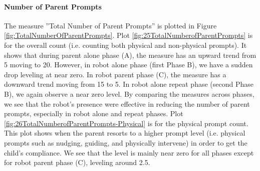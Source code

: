 \paragraph{Number of Parent Prompts}
The measure ''Total Number of Parent Prompts'' is plotted in Figure \ref{fig:TotalNumberOfParentPrompts}.  Plot \ref{fig:25TotalNumberofParentPrompts} is for the overall count (i.e. counting both physical and non-physical prompts).  It shows that during parent alone phase (A), the measure has an upward trend from 5 moving to 20.  However, in robot alone phase (first Phase B), we have a sudden drop leveling at near zero.  In robot parent phase (C), the measure has a downward trend moving from 15 to 5.  In robot alone repeat phase (second Phase B), we again observe a near zero level.  By comparing the measures across phases, we see that the robot's presence were effective in reducing the number of parent prompts, especially in robot alone and repeat phases.  Plot \ref{fig:26TotalNumberofParentPrompts-Physical} is for the physical prompt count.  This plot shows when the parent resorts to a higher prompt level (i.e. physical prompts such as nudging, guiding, and physically intervene) in order to get the child's compliance.  We see that the level is mainly near zero for all phases except for robot parent phase (C), leveling around 2.5.
